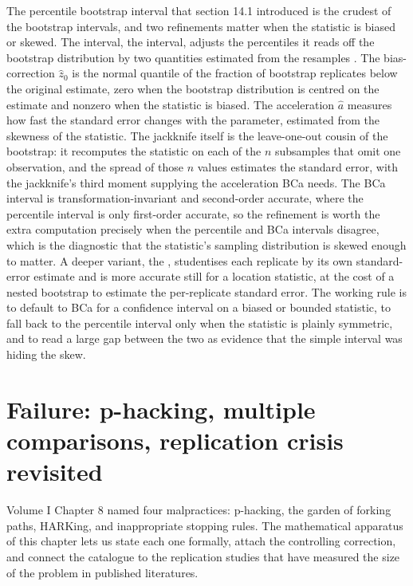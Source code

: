 

\begin{mastery}
The percentile bootstrap interval that section 14.1 introduced is the
crudest of the bootstrap intervals, and two refinements matter when
the statistic is biased or skewed. The  interval, the  interval, adjusts the
percentiles it reads off the bootstrap distribution by two quantities
estimated from the resamples \cite{paper:ch08-efron-bca-1987}. The
bias-correction $\hat{z}_{0}$ is the normal quantile of the fraction
of bootstrap replicates below the original estimate, zero when the
bootstrap distribution is centred on the estimate and nonzero when the
statistic is biased. The acceleration $\hat{a}$ measures how fast the
standard error changes with the parameter, estimated from the
 skewness of the statistic. The jackknife itself is
the leave-one-out cousin of the bootstrap: it recomputes the statistic
on each of the $n$ subsamples that omit one observation, and the
spread of those $n$ values estimates the standard error, with the
jackknife's third moment supplying the acceleration BCa needs. The BCa
interval is transformation-invariant and second-order accurate, where
the percentile interval is only first-order accurate, so the
refinement is worth the extra computation precisely when the
percentile and BCa intervals disagree, which is the diagnostic that
the statistic's sampling distribution is skewed enough to matter. A
deeper variant, the , studentises each replicate
by its own standard-error estimate and is more accurate still for a
location statistic, at the cost of a nested bootstrap to estimate the
per-replicate standard error. The working rule is to default to BCa
for a confidence interval on a biased or bounded statistic, to fall
back to the percentile interval only when the statistic is plainly
symmetric, and to read a large gap between the two as evidence that
the simple interval was hiding the skew.
\end{mastery}

\section{Failure: p-hacking, multiple comparisons, replication crisis revisited}

Volume I Chapter 8 named four malpractices: p-hacking, the garden
of forking paths, HARKing, and inappropriate stopping rules. The
mathematical apparatus of this chapter lets us state each one
formally, attach the controlling correction, and connect the
catalogue to the replication studies that have measured the size of
the problem in published literatures.

